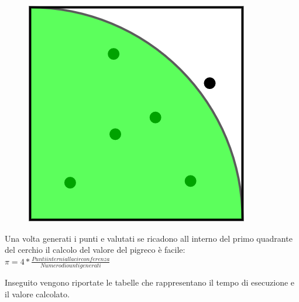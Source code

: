 \documentclass[12pt,a4paper]{report}
\begin{document}
\begin{figure}[h]
\centering
\includegraphics[scale=0.3]{Img/qCirc.png}
\end{figure}
Una volta generati i punti e valutati se ricadono all interno del primo quadrante del cerchio il calcolo del valore del pigreco è facile: \\

\vspace{1cm}
$ \pi = 4 * \frac{Punti interni alla circonferenza}{Numero di ounti generati} $ 

	

Inseguito vengono riportate le tabelle che rappresentano il tempo di esecuzione e il valore calcolato.
\end{document}
